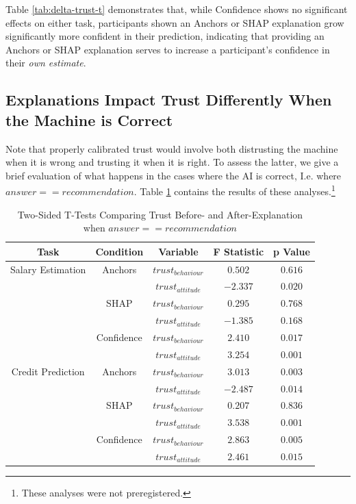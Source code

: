 Table \ref{tab:delta-trust-t} demonstrates that, while Confidence shows no significant effects on either task, participants shown an Anchors or SHAP explanation grow significantly more confident in their prediction, indicating that providing an Anchors or SHAP explanation serves to increase a participant's confidence in their \emph{own estimate}.

\subsection{Explanations Impact Trust Differently When the Machine is Correct}
Note that properly calibrated trust would involve both distrusting the machine when it is wrong and trusting it when it is right. To assess the latter, we give a brief evaluation of what happens in the cases where the AI is correct, I.e. where $answer == recommendation$. Table \ref{tab:delta-trust-t-positives} contains the results of these analyses.\footnote{These analyses were not preregistered.}

\begin{table}[htbp]
    \caption{Two-Sided T-Tests Comparing Trust Before- and After-Explanation when $answer == recommendation$}
    \begin{center}
    \begin{tabular}{ccccc}
        \toprule
        Task & Condition & Variable & F Statistic & p Value \\ 
        \midrule
        Salary Estimation & Anchors & $trust_{behaviour}$ & $0.502$ & $0.616$ \\
        & & $trust_{attitude}$ & $\mathbf{-2.337}$ & $\mathbf{0.020}$ \\
        & SHAP & $trust_{behaviour}$ & $0.295$ & $0.768$ \\
        & & $trust_{attitude}$ & $-1.385$ & $0.168$ \\
        & Confidence & $trust_{behaviour}$ & $\mathbf{2.410}$ & $\mathbf{0.017}$ \\
        & & $trust_{attitude}$ & $\mathbf{3.254}$ & $\mathbf{0.001}$ \\
        \midrule
        Credit Prediction & Anchors & $trust_{behaviour}$ & $\mathbf{3.013}$ & $\mathbf{0.003}$ \\
        & & $trust_{attitude}$ & $\mathbf{-2.487}$ & $\mathbf{0.014}$ \\
        & SHAP & $trust_{behaviour}$ & $0.207$ & $0.836$ \\
        & & $trust_{attitude}$ & $\mathbf{3.538}$ & $\mathbf{0.001}$ \\
        & Confidence & $trust_{behaviour}$ & $\mathbf{2.863}$ & $\mathbf{0.005}$ \\
        & & $trust_{attitude}$ & $\mathbf{2.461}$ & $\mathbf{0.015}$ \\
        \bottomrule
    \end{tabular}
    \label{tab:delta-trust-t-positives}
    \end{center}
\end{table}

